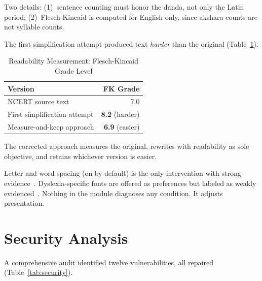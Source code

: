 Two details: (1)~sentence counting must honor the danda, not only the Latin period; (2)~Flesch-Kincaid is computed for English only, since akshara counts are not syllable counts.

The first simplification attempt produced text \textit{harder} than the original (Table~\ref{tab:readability}).

\begin{table}
\caption{Readability Measurement: Flesch-Kincaid Grade Level}
\label{tab:readability}
\centering
\begin{tabular}{@{}lr@{}}
\toprule
\textbf{Version} & \textbf{FK Grade} \\
\midrule
NCERT source text & 7.0 \\
First simplification attempt & \textbf{8.2} (harder) \\
Measure-and-keep approach & \textbf{6.9} (easier) \\
\bottomrule
\end{tabular}
\end{table}

The corrected approach measures the original, rewrites with readability as sole objective, and retains whichever version is easier.

Letter and word spacing (on by default) is the only intervention with strong evidence~\cite{b13}. Dyslexia-specific fonts are offered as preferences but labeled as weakly evidenced~\cite{b14,b15}. Nothing in the module diagnoses any condition. It adjusts presentation.
\fi

\ifconf\else  %
\section{Security Analysis}

A comprehensive audit identified twelve vulnerabilities, all repaired (Table~\ref{tab:security}).

